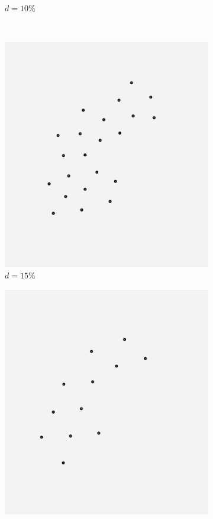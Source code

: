 \begin{figure}[!h]
\begin{subfigure}[b]{0.26\linewidth}
	\caption{\small $d=10\%$} 
    \label{fig:10_sweden} 
    \vspace{4ex}
  \end{subfigure}%
 \\ \vspace{-0.7cm}
  \begin{subfigure}[b]{0.26\linewidth}
    \centering
    \includegraphics[width=0.9\linewidth]{Pictures/15_sweden} 
    \caption{\small $d=15\%$} 
    \label{fig:15_sweden} 
    \vspace{4ex}
  \end{subfigure}
  \begin{subfigure}[b]{0.26\linewidth}
  	\centering
  	\includegraphics[width=0.9\linewidth]{Pictures/20_sweden} 

\end{subfigure}
\end{figure}
